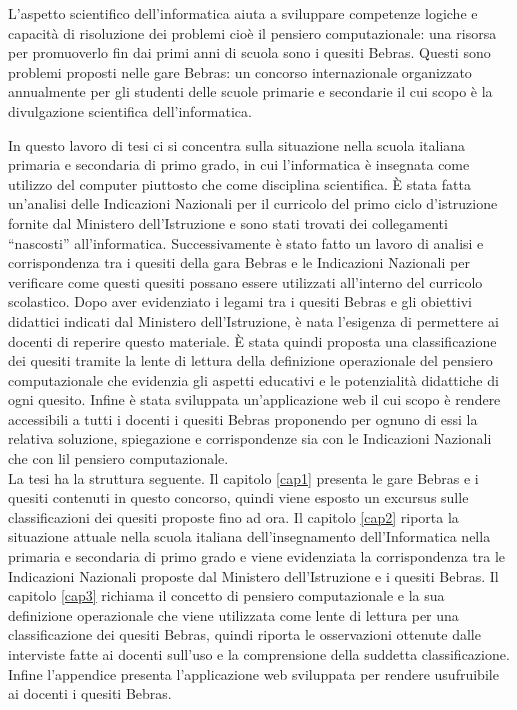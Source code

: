 \documentclass[12pt]{report}
\begin{document}
L'aspetto scientifico dell'informatica aiuta a sviluppare competenze logiche e capacità di risoluzione dei problemi cioè il pensiero computazionale: una risorsa per promuoverlo fin dai primi anni di scuola sono i quesiti Bebras. Questi sono problemi proposti nelle gare Bebras: un concorso internazionale organizzato annualmente per gli studenti delle scuole primarie e secondarie il cui scopo è la divulgazione scientifica dell'informatica.

In questo lavoro di tesi ci si concentra sulla situazione nella scuola italiana primaria e secondaria di primo grado, in cui l'informatica è insegnata come utilizzo del computer piuttosto che come disciplina scientifica.
\`{E} stata fatta un'analisi delle Indicazioni Nazionali per il curricolo del primo ciclo d'istruzione fornite dal Ministero dell'Istruzione e sono stati trovati dei collegamenti ``nascosti'' all'informatica.
Successivamente è stato fatto un lavoro di analisi e corrispondenza tra i quesiti della gara Bebras e le Indicazioni Nazionali per verificare come questi quesiti possano essere utilizzati all'interno del curricolo scolastico.
Dopo aver evidenziato i legami tra i quesiti Bebras e gli obiettivi didattici indicati dal Ministero dell'Istruzione, è nata l'esigenza di permettere ai docenti di reperire questo materiale. \`{E} stata quindi proposta una classificazione dei quesiti tramite la lente di lettura della definizione operazionale del pensiero computazionale che evidenzia gli aspetti educativi e le potenzialità didattiche di ogni quesito.
Infine è stata sviluppata un'applicazione web il cui scopo è rendere accessibili a tutti i docenti i quesiti Bebras proponendo per ognuno di essi la relativa soluzione, spiegazione e corrispondenze sia con le Indicazioni Nazionali che con lil pensiero computazionale.
\\

La tesi ha la struttura seguente. Il capitolo \ref{cap1} presenta le gare Bebras e i quesiti contenuti in questo concorso, quindi viene esposto un excursus sulle classificazioni dei quesiti proposte fino ad ora.
Il capitolo \ref{cap2} riporta la situazione attuale nella scuola italiana dell'insegnamento dell'Informatica nella primaria e secondaria di primo grado e viene evidenziata la corrispondenza tra le Indicazioni Nazionali proposte dal Ministero dell'Istruzione e i quesiti Bebras.
Il capitolo \ref{cap3} richiama il concetto di pensiero computazionale e la sua definizione operazionale che viene utilizzata come lente di lettura per una classificazione dei quesiti Bebras, quindi riporta le osservazioni ottenute dalle interviste fatte ai docenti sull'uso e la comprensione della suddetta classificazione.
Infine l'appendice presenta l'applicazione web sviluppata per rendere usufruibile ai docenti i quesiti Bebras.
%
%
% 
% 
\end{document}
